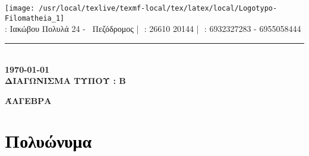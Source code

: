 \documentclass[ektypwsh]{article}
\begin{document}
\begin{center}
\texttt{[image: /usr/local/texlive/texmf-local/tex/latex/local/Logotypo-Filomatheia\_1]}\\
\vspace{-1mm}
{} : Ιακώβου Πολυλά 24 - \ Πεζόδρομος\,\,|\,\,{} : 26610 20144\,\,|\,\, {} : 6932327283 - 6955058444\\
\vspace{-1mm}
\rule{14.7cm}{.1mm}\\
\vspace{2mm}
{\textbf{\today}}\\
\vspace{3mm}
{\Large \textbf{ΔΙΑΓΩΝΙΣΜΑ ΤΥΠΟΥ : B}}
\end{center}
\begin{center}
{\Large\MakeUppercase{\textbf{Άλγεβρα}}}
\vspace{-5mm}
\section*{\huge \textcolor{black}{Πολυώνυμα}}
\vspace{5mm}
\end{center}
\end{document}
